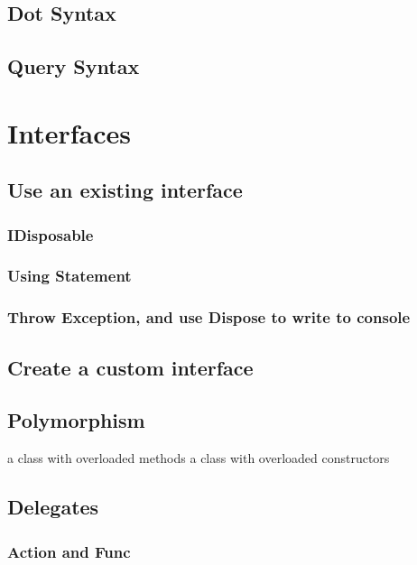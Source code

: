 \documentclass {amsart}
\begin{document}
	\subsection{Dot Syntax}
	\subsection{Query Syntax}

\section{Interfaces}
	\subsection{Use an existing interface}
		\subsubsection{IDisposable}
		\subsubsection{Using Statement}
		\subsubsection{Throw Exception, and use Dispose to write to console}
	\subsection{Create a custom interface}

\subsection{Polymorphism}
	\Create a class with overloaded methods
	\Create a class with overloaded constructors
	

\subsection{Delegates}
	\subsubsection{Action and Func}
\end{document}
